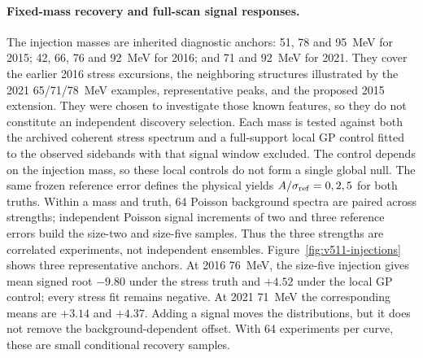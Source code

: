 \paragraph{Fixed-mass recovery and full-scan signal responses.}
The injection masses are inherited diagnostic anchors: 51, 78 and 95~MeV
for 2015; 42, 66, 76 and 92~MeV for 2016; and 71 and 92~MeV for 2021.
They cover the earlier 2016 stress excursions, the neighboring structures
illustrated by the 2021 65/71/78~MeV examples, representative peaks, and
the proposed 2015 extension. They were chosen to investigate those known
features, so they do not constitute an independent discovery selection.
Each mass is tested against both the archived coherent stress spectrum
and a full-support local GP control fitted to the observed sidebands
with that signal window excluded. The control depends on the injection
mass, so these local controls do not form a single global null. The same frozen reference
error defines the physical yields $A/\sigma_{\rm ref}=0,2,5$ for both
truths. Within a mass and truth, 64 Poisson background spectra are paired
across strengths; independent Poisson signal increments of two and three
reference errors build the size-two and size-five samples. Thus the
three strengths are correlated experiments, not independent ensembles.
Figure~\ref{fig:v511-injections} shows three representative anchors.
At 2016 76~MeV, the size-five injection gives mean signed root $-9.80$
under the stress truth and $+4.52$ under the local GP control; every
stress fit remains negative. At 2021 71~MeV the corresponding means are
$+3.14$ and $+4.37$. Adding a signal moves the distributions, but it does
not remove the background-dependent offset. With 64 experiments per
curve, these are small conditional recovery samples.

